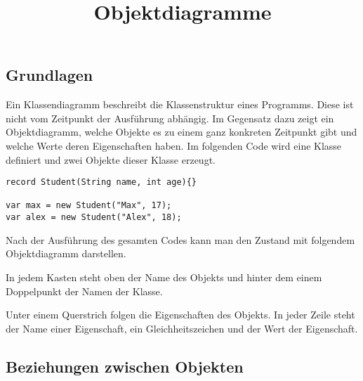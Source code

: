\documentclass[a4paper]{scrartcl}
\date{}
\title{Objektdiagramme}
\begin{document}
\switchUmlcdSchool
\subsection*{Grundlagen}

Ein Klassendiagramm beschreibt die Klassenstruktur eines Programms.
Diese ist nicht vom Zeitpunkt der Ausführung abhängig.
Im Gegensatz dazu zeigt ein Objektdiagramm, welche Objekte es zu einem ganz konkreten Zeitpunkt gibt und welche Werte deren Eigenschaften haben.
Im folgenden Code wird eine Klasse definiert und zwei Objekte dieser Klasse erzeugt.
\begin{verbatim}
record Student(String name, int age){}

var max = new Student("Max", 17);
var alex = new Student("Alex", 18);
\end{verbatim}
\noindent

Nach der Ausführung des gesamten Codes kann man den Zustand mit folgendem Objektdiagramm darstellen.

\begin{center}
\end{center}
In jedem Kasten steht oben der Name des Objekts und hinter dem einem Doppelpunkt der Namen der Klasse.

Unter einem Querstrich folgen die Eigenschaften des Objekts.
In jeder Zeile steht der Name einer Eigenschaft, ein Gleichheitszeichen und der Wert der Eigenschaft.


\subsection*{Beziehungen zwischen Objekten}
\end{document}

